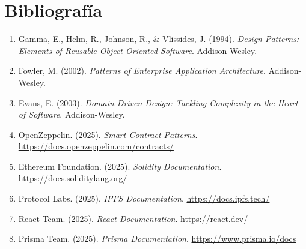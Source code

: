 \documentclass[11pt, a4paper]{article}
\begin{document}
\section*{Bibliografía}

\begin{enumerate}
    \item Gamma, E., Helm, R., Johnson, R., \& Vlissides, J. (1994). \textit{Design Patterns: Elements of Reusable Object-Oriented Software}. Addison-Wesley.
    \item Fowler, M. (2002). \textit{Patterns of Enterprise Application Architecture}. Addison-Wesley.
    \item Evans, E. (2003). \textit{Domain-Driven Design: Tackling Complexity in the Heart of Software}. Addison-Wesley.
    \item OpenZeppelin. (2025). \textit{Smart Contract Patterns}. \url{https://docs.openzeppelin.com/contracts/}
    \item Ethereum Foundation. (2025). \textit{Solidity Documentation}. \url{https://docs.soliditylang.org/}
    \item Protocol Labs. (2025). \textit{IPFS Documentation}. \url{https://docs.ipfs.tech/}
    \item React Team. (2025). \textit{React Documentation}. \url{https://react.dev/}
    \item Prisma Team. (2025). \textit{Prisma Documentation}. \url{https://www.prisma.io/docs}
\end{enumerate}
\end{document}
